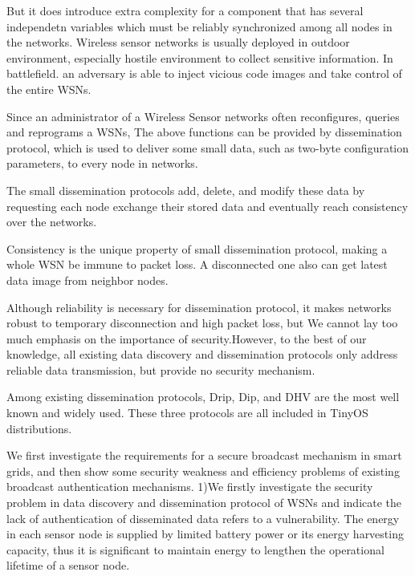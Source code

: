 \documentclass[lnicst,sechang,a4paper]{svmultln}
\begin{document}
But it does introduce extra complexity for a component that has several independetn variables which must be reliably synchronized among all nodes in the networks.
Wireless sensor networks is usually deployed in outdoor environment, especially hostile environment to collect sensitive information. In battlefield. an adversary is able to inject vicious code images and take control of the entire WSNs.

Since an administrator of a Wireless Sensor networks often reconfigures, queries and reprograms a WSNs, The above functions can be provided by dissemination protocol, which is used to deliver some small data, such as two-byte configuration parameters, to every node in networks.

The small dissemination protocols add, delete, and modify these data by requesting each node exchange their stored data and eventually reach consistency over the networks.

Consistency is the unique property of small dissemination protocol, making a whole WSN be immune to packet loss. A disconnected one also can get latest data image from neighbor nodes.

Although reliability is necessary for dissemination protocol, it makes networks robust to temporary disconnection and high packet loss, but We cannot lay too much emphasis on the importance of security.However, to the best of our knowledge, all existing data discovery and dissemination protocols only address reliable data transmission, but provide no security mechanism.

Among existing dissemination protocols, Drip, Dip, and DHV are the most well known and widely used. These three protocols are all included in TinyOS distributions.

We first investigate the requirements for a secure broadcast mechanism in smart grids, and then show some security weakness and efficiency problems of existing broadcast authentication mechanisms.
1)We firstly investigate the security problem in data discovery and dissemination protocol of WSNs and indicate the lack of authentication of disseminated data refers to a vulnerability. The energy in each sensor node is supplied by limited battery power or its energy harvesting capacity, thus it is significant to maintain energy to lengthen the operational lifetime of a sensor node.
\end{document}

